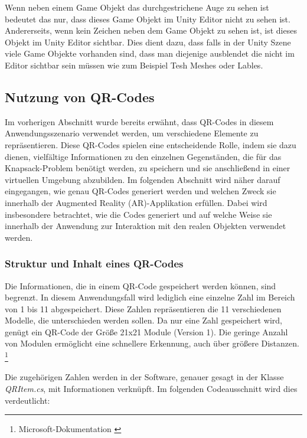 Wenn neben einem Game Objekt das durchgestrichene Auge zu sehen ist bedeutet das nur, dass dieses Game Objekt im Unity Editor nicht zu sehen ist. Andererseits, wenn kein Zeichen
neben dem Game Objekt zu sehen ist, ist dieses Objekt im Unity Editor sichtbar. Dies dient dazu, dass falls in der Unity Szene viele Game Objekte vorhanden sind, dass man
diejenige ausblendet die nicht im Editor sichtbar sein müssen wie zum Beispiel Tesh Meshes oder Lables.



\subsection{\label{sec:qrcodes}Nutzung von QR-Codes} 
Im vorherigen Abschnitt wurde bereits erwähnt, dass QR-Codes in diesem Anwendungsszenario verwendet werden, um verschiedene Elemente zu repräsentieren. Diese QR-Codes spielen eine entscheidende Rolle, indem sie dazu dienen, vielfältige Informationen zu den einzelnen Gegenständen, die für das Knapsack-Problem benötigt werden, zu speichern und sie anschließend in einer virtuellen Umgebung abzubilden. Im folgenden Abschnitt wird näher darauf eingegangen, wie genau QR-Codes generiert werden und welchen Zweck sie innerhalb der Augmented Reality (AR)-Applikation erfüllen. Dabei wird insbesondere betrachtet, wie die Codes generiert und auf welche Weise sie innerhalb der Anwendung zur Interaktion mit den realen Objekten verwendet werden.

\subsubsection{Struktur und Inhalt eines QR-Codes}
Die Informationen, die in einem QR-Code gespeichert werden können, sind begrenzt. In diesem Anwendungsfall wird lediglich
eine einzelne Zahl im Bereich von 1 bis 11 abgespeichert. Diese Zahlen repräsentieren die 11 verschiedenen Modelle, die unterschieden werden sollen. Da nur eine Zahl gespeichert wird, genügt ein QR-Code der Größe 21x21 Module (Version 1). Die
geringe Anzahl von Modulen ermöglicht eine schnellere Erkennung, auch über größere
Distanzen.  \footnote{Microsoft-Dokumentation \cite{QR-Code-Tracking}}

Die zugehörigen Zahlen werden in der Software, genauer gesagt in der Klasse \textit{QRItem.cs}, mit Informationen verknüpft. Im folgenden Codeausschnitt wird dies verdeutlicht:

